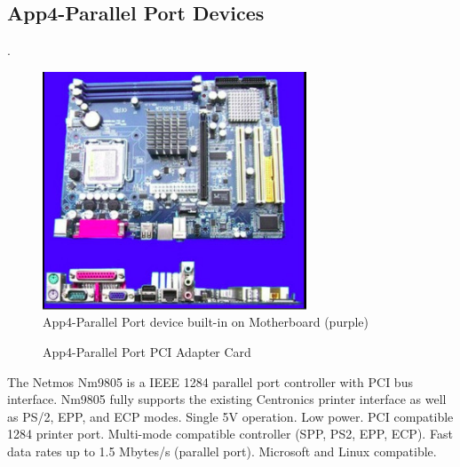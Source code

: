 \clearpage
\pagebreak

\subsection{App4-Parallel Port Devices}. 
				
		\begin{figure}[htbp]
			\begin{center}
				\includegraphics[width=0.700\textwidth]{./07-images/img-Ch4/Captured-Parallel-Port-Built-in-Motherboard.jpg}
				\caption{App4-Parallel Port device built-in on Motherboard (purple)}
				\label{fig:App4-Captured-Parallel-Port-Built-in-Motherboard.jpg}
			\end{center}
		 \end{figure}
		 
		
		\begin{figure}[htbp]
			\begin{center}
				\caption{App4-Parallel Port PCI Adapter Card}
				\label{fig:App4-Captured-Parallel-Port-PCI-Adapter-Card.jpg}
			\end{center}
		\end{figure}
The Netmos Nm9805 is a IEEE 1284 parallel port controller with PCI bus interface. Nm9805 fully supports the existing Centronics printer interface as well as PS/2, EPP, and ECP modes. Single 5V operation. Low power. PCI compatible 1284 printer port. Multi-mode compatible controller (SPP, PS2, EPP, ECP). Fast data rates up to 1.5 Mbytes/s (parallel port). Microsoft and Linux compatible. 

